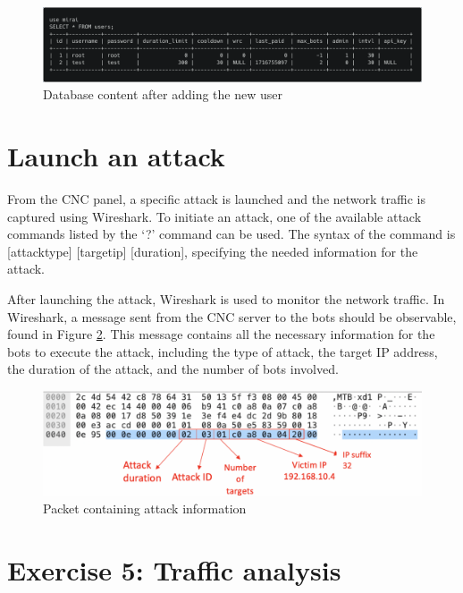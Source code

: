 \begin{figure}
    \centering
    \includegraphics[width=1.0\textwidth]{resources/images/table_users.png}
    \caption{Database content after adding the new user}
    \label{fig:table_users}
\end{figure}

\section{Launch an attack}

From the CNC panel, a specific attack is launched and the network traffic is captured using Wireshark. To initiate an attack, one of the available attack commands listed by the `?' command can be used. The syntax of the command is [attack\textunderscore type] [target\textunderscore ip] [duration], specifying the needed information for the attack.
 
After launching the attack, Wireshark is used to monitor the network traffic. In Wireshark, a message sent from the CNC server to the bots should be observable, found in Figure \ref{fig:wireshark_attack}. This message contains all the necessary information for the bots to execute the attack, including the type of attack, the target IP address, the duration of the attack, and the number of bots involved.

\begin{figure}
	\centering
	\includegraphics[width=1.0\textwidth]{resources/images/wireshark_attack.png}
	\caption{Packet containing attack information}
	\label{fig:wireshark_attack}
\end{figure}

\section{Exercise 5: Traffic analysis}

